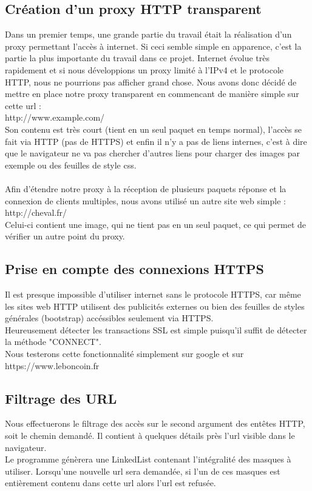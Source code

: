 \documentclass{scrreprt}
\begin{document}
\subsection{Création d'un proxy HTTP transparent}
Dans un premier temps, une grande partie du travail était la réalisation d'un proxy permettant l'accès à internet. Si ceci semble simple en apparence, c'est la partie la plus importante du travail dans ce projet. Internet évolue très rapidement et si nous développions un proxy limité à l'IPv4 et le protocole HTTP, nous ne pourrions pas afficher grand chose. Nous avons donc décidé de mettre en place notre proxy transparent en commencant de manière simple sur cette url :\\
http://www.example.com/\\
Son contenu est très court (tient en un seul paquet en temps normal), l'accès se fait via HTTP (pas de HTTPS) et enfin il n'y a pas de liens internes, c'est à dire que le navigateur ne va pas chercher d'autres liens pour charger des images par exemple ou des feuilles de style css.\\
\\
Afin d'étendre notre proxy à la réception de plusieurs paquets réponse et la connexion de clients multiples, nous avons utilisé un autre site web simple :\\
http://cheval.fr/\\
Celui-ci contient une image, qui ne tient pas en un seul paquet, ce qui permet de vérifier un autre point du proxy.

\subsection{Prise en compte des connexions HTTPS}
Il est presque impossible d'utiliser internet sans le protocole HTTPS, car même les sites web HTTP utilisent des publicités externes ou bien des feuilles de styles générales (bootstrap) accéssibles seulement via HTTPS.\\
Heureusement détecter les transactions SSL est simple puisqu'il suffit de détecter la méthode "CONNECT".
\\
Nous testerons cette fonctionnalité simplement sur google et sur\\
https://www.leboncoin.fr

\subsection{Filtrage des URL}
Nous effectuerons le filtrage des accès sur le second argument des entêtes HTTP, soit le chemin demandé. Il contient à quelques détails près l'url visible dans le navigateur.\\
Le programme génèrera une LinkedList contenant l'intégralité des masques à utiliser. Lorsqu'une nouvelle url sera demandée, si l'un de ces masques est entièrement contenu dans cette url alors l'url est refusée.\\
\end{document}
